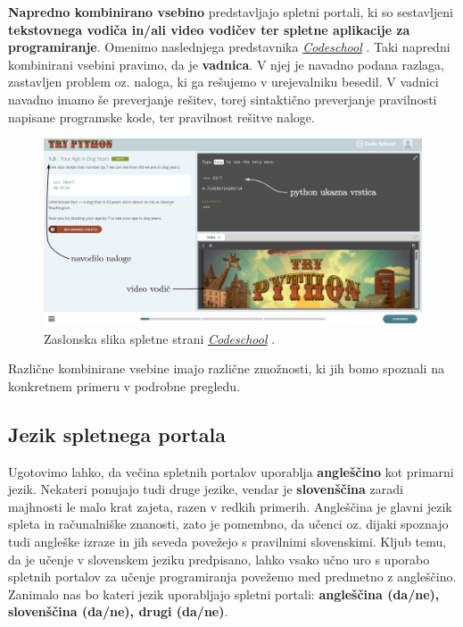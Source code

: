 \textbf{Napredno kombinirano vsebino} predstavljajo spletni portali,
ki so sestavljeni \textbf{tekstovnega vodiča in/ali video vodičev ter
  spletne aplikacije za programiranje}. Omenimo naslednjega
predstavnika \emph{\href{https://www.codeschool.com/}{Codeschool}}
\cite{web:codeschool}. Taki napredni kombinirani vsebini pravimo, da
je \textbf{vadnica}. V njej je navadno podana razlaga, zastavljen
problem oz. naloga, ki ga rešujemo v urejevalniku besedil. V vadnici
navadno imamo še  preverjanje rešitev, torej sintaktično preverjanje
pravilnosti napisane programske kode, ter pravilnost rešitve naloge.

\begin{figure}[h!]
    \includegraphics [width=1\linewidth, keepaspectratio =
    1] {./images/sc_web/codeschool_01.jpg}
    \caption{Zaslonska slika spletne strani
      \emph{\href{https://www.codeschool.com/}{Codeschool}}
      \cite{web:codeschool}.}
    \label{fig:scr:web:codeschool}
\end{figure}

Različne kombinirane vsebine imajo različne zmožnosti, ki jih bomo
spoznali na konkretnem primeru v podrobne pregledu. 

\subsection{Jezik spletnega portala}
\label{sec:jezik_spletnega_portala}

Ugotovimo lahko, da večina spletnih portalov uporablja
\textbf{angleščino} kot primarni jezik. Nekateri ponujajo tudi druge
jezike, vendar je \textbf{slovenščina} zaradi majhnosti le malo krat
zajeta, razen v redkih primerih. Angleščina je glavni jezik spleta in
računalniške znanosti, zato je pomembno, da učenci oz. dijaki spoznajo
tudi angleške izraze in jih seveda povežejo s pravilnimi
slovenskimi. Kljub temu, da je učenje v slovenskem jeziku predpisano,
lahko vsako učno uro s uporabo spletnih portalov za učenje
programiranja povežemo med predmetno z angleščino. Zanimalo nas bo
kateri jezik uporabljajo spletni portali: \textbf{angleščina (da/ne),
  slovenščina (da/ne), drugi (da/ne)}.

